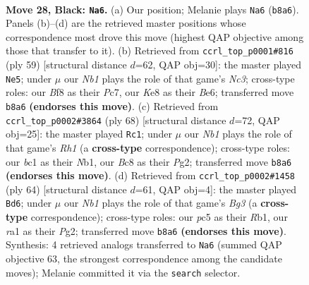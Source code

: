\documentclass[11pt]{article}
\begin{document}
\clearpage

\begin{figure}[p]\centering
\begin{subfigure}{0.46\textwidth}\centering
\resizebox{\linewidth}{!}{%
\newchessgame
\chessboard[
  setfen={rnbNkbn1/ppp1p3/8/P1P5/5P2/3R4/1P6/RNB1K3 b Q - 0 28},
  showmover=false,
  pgfstyle=straightmove, color=movearrow, markmove={b8-a6}
]}
\caption{}
\end{subfigure}\hfill
\begin{subfigure}{0.46\textwidth}\centering
\resizebox{\linewidth}{!}{%
\newchessgame
\chessboard[
  setfen={1r5k/2p3pp/2n1b3/pp1p1N2/4p3/PPP5/1B3R2/3B1K2 b - - 4 30},
  showmover=false,
  pgfstyle=straightmove, color=movearrow, markmove={c6-e5}
]}
\caption{}
\end{subfigure}
\\[4pt]
\begin{subfigure}{0.46\textwidth}\centering
\resizebox{\linewidth}{!}{%
\newchessgame
\chessboard[
  setfen={3r2k1/6b1/4p1pp/1b2np2/1N6/P1B1PP2/5KPP/1N5R w - - 0 35},
  showmover=false,
  pgfstyle=straightmove, color=movearrow, markmove={h1-c1}
]}
\caption{}
\end{subfigure}\hfill
\begin{subfigure}{0.46\textwidth}\centering
\resizebox{\linewidth}{!}{%
\newchessgame
\chessboard[
  setfen={3b3k/1r4p1/1n2pp1p/rP6/3PP3/p1R1N1BP/5PP1/1R4K1 w - - 0 33},
  showmover=false,
  pgfstyle=straightmove, color=movearrow, markmove={g3-d6}
]}
\caption{}
\end{subfigure}
\caption{\textbf{Move 28, Black: \texttt{Na6}.} (a) Our position; Melanie plays \texttt{Na6} (\texttt{b8a6}). Panels (b)--(d) are the retrieved master positions whose correspondence most drove this move (highest QAP objective among those that transfer to it). (b) Retrieved from \texttt{ccrl\_top\_p0001\#816} (ply 59) [structural distance $d$=62, QAP obj=30]: the master played \texttt{Ne5}; under $\mu$ our \emph{Nb1} plays the role of that game's \emph{Nc3}; cross-type roles: our \emph{B}f8 as their \emph{P}c7, our \emph{K}e8 as their \emph{B}e6; transferred move \texttt{b8a6} \textbf{(endorses this move)}. (c) Retrieved from \texttt{ccrl\_top\_p0002\#3864} (ply 68) [structural distance $d$=72, QAP obj=25]: the master played \texttt{Rc1}; under $\mu$ our \emph{Nb1} plays the role of that game's \emph{Rh1} (a \textbf{cross-type} correspondence); cross-type roles: our \emph{b}c1 as their \emph{N}b1, our \emph{B}c8 as their \emph{P}g2; transferred move \texttt{b8a6} \textbf{(endorses this move)}. (d) Retrieved from \texttt{ccrl\_top\_p0002\#1458} (ply 64) [structural distance $d$=61, QAP obj=4]: the master played \texttt{Bd6}; under $\mu$ our \emph{Nb1} plays the role of that game's \emph{Bg3} (a \textbf{cross-type} correspondence); cross-type roles: our \emph{p}c5 as their \emph{R}b1, our \emph{r}a1 as their \emph{P}g2; transferred move \texttt{b8a6} \textbf{(endorses this move)}. Synthesis: 4 retrieved analogs transferred to \texttt{Na6} (summed QAP objective 63, the strongest correspondence among the candidate moves); Melanie committed it via the \texttt{search} selector.}
\label{fig:thought-m55}
\end{figure}
\end{document}
